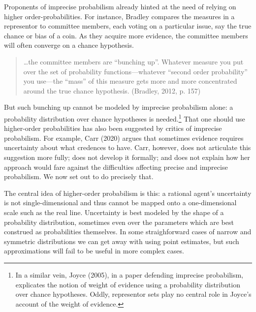 \documentclass[
  letterpaper,
  DIV=11,
  numbers=noendperiod]{scrartcl}
\begin{document}
Proponents of imprecise probabilism already hinted at the need of
relying on higher order-probabilities. For instance, Bradley compares
the measures in a representor to committee members, each voting on a
particular issue, say the true chance or bias of a coin. As they acquire
more evidence, the committee members will often converge on a chance
hypothesis.

\begin{quote}
\dots the committee members are ``bunching up''. Whatever measure you
put over the set of probability functions---whatever ``second order
probability'' you use---the ``mass'' of this measure gets more and more
concentrated around the true chance hypothesis. (Bradley, 2012, p. 157)
\end{quote}

\noindent But such bunching up cannot be modeled by imprecise
probabilism alone: a probability distribution over chance hypotheses is
needed.\footnote{In a similar vein, Joyce (2005), in a paper defending
  imprecise probabilism, explicates the notion of weight of evidence
  using a probability distribution over chance hypotheses. Oddly,
  representor sets play no central role in Joyce's account of the weight
  of evidence.} That one should use higher-order probabilities has also
been suggested by critics of imprecise probabilism. For example, Carr
(2020) argues that sometimes evidence requires uncertainty about what
credences to have. Carr, however, does not articulate this suggestion
more fully; does not develop it formally; and does not explain how her
approach would fare against the difficulties affecting precise and
imprecise probabilism. We now set out to do precisely that.


The central idea of higher-order probabilism is this: a rational agent's
uncertainty is not single-dimensional and thus cannot be mapped onto a
one-dimensional scale such as the real line. Uncertainty is best modeled
by the shape of a probability distribution, sometimes even over the
parameters which are best construed as probabilities themselves. In some
straighforward cases of narrow and symmetric distributions we can get
away with using point estimates, but such approximations will fail to be
useful in more complex cases.
\end{document}
